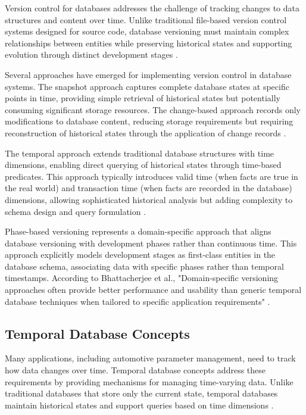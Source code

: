 Version control for databases addresses the challenge of tracking changes to data structures and content over time. Unlike traditional file-based version control systems designed for source code, database versioning must maintain complex relationships between entities while preserving historical states and supporting evolution through distinct development stages \cite{bhattacherjee2015principles}.

Several approaches have emerged for implementing version control in database systems. The snapshot approach captures complete database states at specific points in time, providing simple retrieval of historical states but potentially consuming significant storage resources. The change-based approach records only modifications to database content, reducing storage requirements but requiring reconstruction of historical states through the application of change records \cite{bhattacherjee2015principles}.

The temporal approach extends traditional database structures with time dimensions, enabling direct querying of historical states through time-based predicates. This approach typically introduces valid time (when facts are true in the real world) and transaction time (when facts are recorded in the database) dimensions, allowing sophisticated historical analysis but adding complexity to schema design and query formulation \cite{snodgrass1999developing}.

Phase-based versioning represents a domain-specific approach that aligns database versioning with development phases rather than continuous time. This approach explicitly models development stages as first-class entities in the database schema, associating data with specific phases rather than temporal timestamps. According to Bhattacherjee et al., "Domain-specific versioning approaches often provide better performance and usability than generic temporal database techniques when tailored to specific application requirements" \cite{bhattacherjee2015principles}.


\subsection{Temporal Database Concepts}
\label{subsec:temporal-database-concepts}

Many applications, including automotive parameter management, need to track how data changes over time. Temporal database concepts address these requirements by providing mechanisms for managing time-varying data. Unlike traditional databases that store only the current state, temporal databases maintain historical states and support queries based on time dimensions \cite{snodgrass1999developing}.


